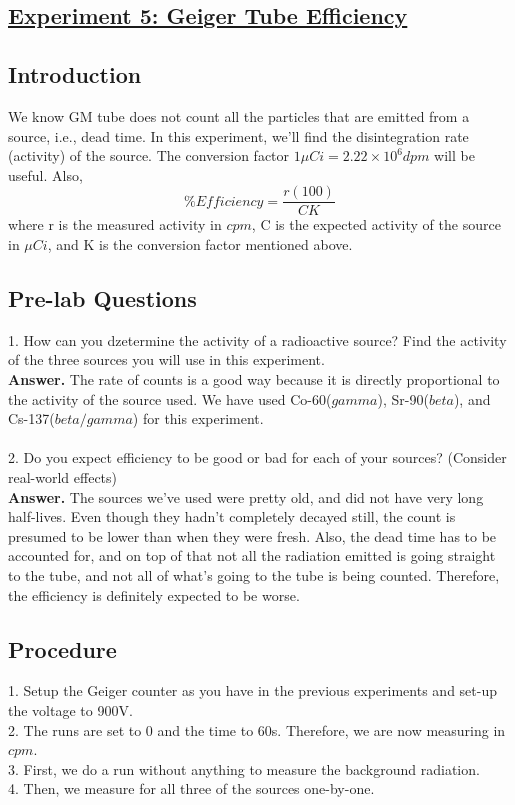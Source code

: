 \documentclass[twocolumn]{article}
\begin{document}
$$$$

\begin{center}\section*{\underline{Experiment 5: Geiger Tube Efficiency}}\end{center}
\subsection*{Introduction}
We know GM tube does not count all the particles that are emitted from a source, i.e., dead time. In this experiment, we'll find the disintegration rate (activity) of the source. The conversion factor  $1\mu Ci=2.22\times 10^6 dpm$ will be useful. Also, \begin{equation*}
\% Efficiency=\frac{r(100)}{CK}\end{equation*}
where r is the measured activity in $cpm$, C is the expected activity of the source in $\mu Ci$, and K is the conversion factor mentioned above.
\subsection*{Pre-lab Questions}
1. How can you dzetermine the activity of a radioactive source? Find the activity of the three sources you will use in this experiment.\\
\textbf{Answer.} The rate of counts is a good way because it is directly proportional to the activity of the source used. We have used Co-60($gamma$), Sr-90($beta$), and Cs-137($beta/gamma$) for this experiment.\\
\\
2. Do you expect efficiency to be good or bad for each of your sources? (Consider real-world effects)\\
\textbf{Answer.} The sources we've used were pretty old, and did not have very long half-lives. Even though they hadn't completely decayed still, the count is presumed to be lower than when they were fresh. Also, the dead time has to be accounted for, and on top of that not all the radiation emitted is going straight to the tube, and not all of what's going to the tube is being counted. Therefore, the efficiency is definitely expected to be worse. \\
\subsection*{Procedure}
1. Setup the Geiger counter as you have in the previous experiments and set-up the voltage to 900V.\\
2. The runs are set to 0 and the time to 60s. Therefore, we are now measuring in $cpm$.\\
3. First, we do a run without anything to measure the background radiation.\\
4. Then, we measure for all three of the sources one-by-one.\\
\end{document}
